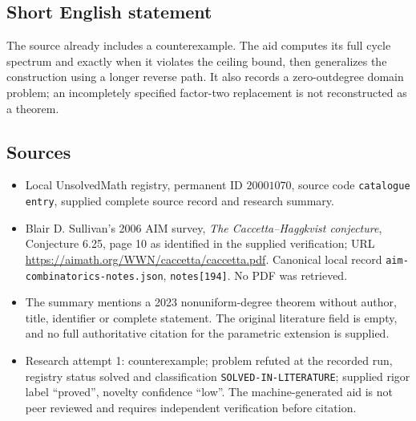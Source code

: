 \documentclass[11pt]{article}
\begin{document}
\subsection{Short English statement}
The source already includes a counterexample. The aid computes its full cycle spectrum and exactly when it violates the ceiling bound, then generalizes the construction using a longer reverse path. It also records a zero-outdegree domain problem; an incompletely specified factor-two replacement is not reconstructed as a theorem.
\subsection{Sources}
\begin{itemize}
\item Local UnsolvedMath registry, permanent ID $20001070$, source code \texttt{catalogue entry}, supplied complete source record and research summary.
\item Blair D. Sullivan's 2006 AIM survey, \emph{The Caccetta--Haggkvist conjecture}, Conjecture 6.25, page 10 as identified in the supplied verification; URL \url{https://aimath.org/WWN/caccetta/caccetta.pdf}. Canonical local record \texttt{aim-combinatorics-notes.json}, \texttt{notes[194]}. No PDF was retrieved.
\item The summary mentions a 2023 nonuniform-degree theorem without author, title, identifier or complete statement. The original literature field is empty, and no full authoritative citation for the parametric extension is supplied.
\item Research attempt 1: counterexample; problem refuted at the recorded run, registry status solved and classification \texttt{SOLVED-IN-LITERATURE}; supplied rigor label ``proved'', novelty confidence ``low''. The machine-generated aid is not peer reviewed and requires independent verification before citation.
\end{itemize}
\end{document}
